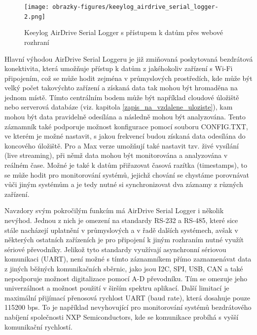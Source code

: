 \begin{figure}[h]
    \centering
    \texttt{[image: obrazky-figures/keeylog\_airdrive\_serial\_logger-2.png]}
    
    \caption{Keeylog AirDrive Serial Logger s přístupem k datům přes webové rozhraní \cite{keelog_airdrive_serial_datalogger, keelog_airdrive_serial_datalogger_scheme}}
    \label{fig:keelog-airdrive-serial-datalogger}
\end{figure}

Hlavní výhodou AirDrive Serial Loggeru je již zmiňovaná poskytovaná bezdrátová konektivita, která umožňuje přístup k datům z jakéhokoliv zařízení s Wi-Fi připojením, což se může hodit zejména v průmyslových  prostředích, kde může být velký počet takovýchto zařízení a získaná data tak mohou být hromaděna na jednom místě. Tímto centrálním bodem může být například cloudové úložiště nebo serverová databáze (viz. kapitola \ref{zapis_na_vzdalene_uloziste}), kam mohou být data pravidelně odesílána a následně mohou být analyzována. Tento záznamník také podporuje možnost konfigurace pomocí souboru CONFIG.TXT, ve kterém je možné nastavit, s jakou frekvencí budou získaná data odesílána do koncového úložiště. Pro a Max verze umožňují také nastavit tzv. živé vysílání (live streaming), při němž data mohou být monitorována a analyzována v reálném čase. Možné je také k datům přiřazovat časová razítka (timestamps), to se může hodit pro monitorování systémů, jejichž chování se chystáme porovnávat vůči jiným systémům a je tedy nutné si synchronizovat dva záznamy z různých zařízení. \cite{keelog_airdrive_serial_datalogger}

Navzdory svým pokročilým funkcím má AirDrive Serial Logger i několik nevýhod. Jednou z nich je omezení na standardy RS-232 a RS-485, které sice stále nacházejí uplatnění v průmyslových a v řadě dalších systémech, avšak v některých ostatních zařízeních je pro připojení k jiným rozhraním nutné využít sériové převodníky. Jelikož tyto standardy využívají asynchronní sériovou komunikaci (UART), není možné s tímto záznamníkem přímo zaznamenávat data z jiných běžných komunikačních sběrnic, jako jsou I2C, SPI, USB, CAN a také nepodporuje možnost digitalizace pomocí A-D převodníku. Tím se omezuje jeho univerzálnost a možnost použití v širším spektru aplikací. Další limitací je maximální přijímací přenosová rychlost UART (baud rate), která dosahuje pouze 115200 bps. To je například nevyhovující pro monitorování systémů bezdrátového nabíjení společnosti NXP Semiconductors, kde se komunikace probíhá s vyšší komunikační rychlostí. \cite{keelog_airdrive_serial_datalogger}

